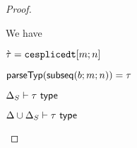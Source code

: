 \begin{proof}
\begin{byCases}


\item[\text{(\ref{rule:cvalidT-U-splicedt})}] We have
\begin{pfsteps*}
\item $\grave{\tau}=\texttt{cesplicedt}[m; n]$ 
\item $\mathsf{parseTyp}(\mathsf{subseq}(b; m; n))=\tau$ 
\item $\Delta_S \vdash \tau~\mathsf{type}$ 
\item ${\Delta}\cup{\Delta_S} \vdash \tau~\mathsf{type}$ 
\end{pfsteps*}
\resetpfcounter
\end{byCases}
\end{proof}

